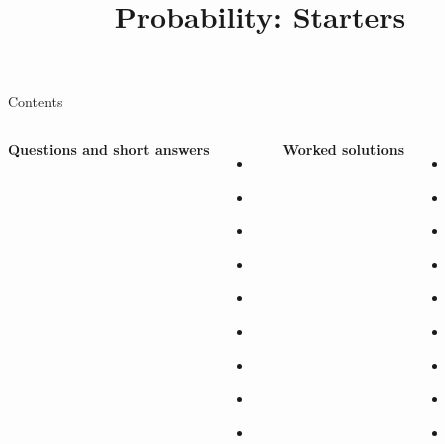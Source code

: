 \documentclass{beamer}
\title{Probability: Starters}
\author{}
\date{}
\begin{document}
\frame{\titlepage}

\begin{frame}[t]{Contents}
\small
\begin{columns}[T]
\textbf{Questions and short answers}
\begin{itemize}
\item \hyperlink{q-st1}{}
\item \hyperlink{q-st2}{}
\item \hyperlink{q-st3}{}
\item \hyperlink{q-st4}{}
\item \hyperlink{q-st5}{}
\item \hyperlink{q-st6}{}
\item \hyperlink{q-st7}{}
\item \hyperlink{q-st8}{}
\item \hyperlink{q-st9}{}
\end{itemize}
\textbf{Worked solutions}
\begin{itemize}
\item \hyperlink{work-st1}{}
\item \hyperlink{work-st2}{}
\item \hyperlink{work-st3}{}
\item \hyperlink{work-st4}{}
\item \hyperlink{work-st5}{}
\item \hyperlink{work-st6}{}
\item \hyperlink{work-st7}{}
\item \hyperlink{work-st8}{}
\item \hyperlink{work-st9}{}
\end{itemize}
\end{columns}
\end{frame}
\end{document}
